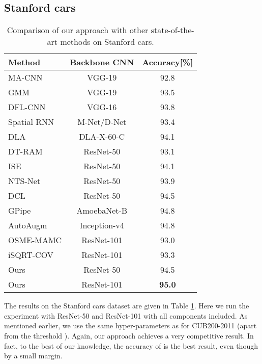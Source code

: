 \documentclass[10pt,twocolumn,letterpaper]{article}
\begin{document}
\subsection{Stanford cars}
\label{section:cars}
\begin{table}[h]
  \begin{center}
  \begin{tabular} {|l|c|c|}
    \hline
    Method & Backbone CNN &  Accuracy[\%] \\
    \hline
    \hline
    MA-CNN \cite{zheng2017learning} & VGG-19 &  92.8 \\
    GMM \cite{liang2018gmm} & VGG-19 &  93.5 \\
    DFL-CNN \cite{wang2018learning} & VGG-16  & 93.8 \\
    Spatial RNN \cite{wu2018deep} & M-Net/D-Net & 93.4\\
    DLA \cite{yu2018deep} & DLA-X-60-C  & 94.1 \\
    DT-RAM \cite{li2017dynamic} & ResNet-50 & 93.1 \\
    ISE \cite{simonelli2018increasingly} & ResNet-50 &  94.1 \\
    NTS-Net \cite{yang2018learning} & ResNet-50 & 93.9 \\
    DCL \cite{Chen_2019_CVPR} & ResNet-50 & 94.5 \\
    GPipe \cite{huang2018gpipe} & AmoebaNet-B &  94.8 \\
    AutoAugm \cite{cubuk2018autoaugment} & Inception-v4 &  94.8 \\
    OSME-MAMC \cite{sun2018multi} & ResNet-101 & 93.0 \\
    iSQRT-COV \cite{li2018towards} & ResNet-101 & 93.3 \\
    \hline
    Ours   & ResNet-50  & 94.5 \\
    Ours   & ResNet-101 &  \bf{95.0} \\
    \hline
  \end{tabular}
  \end{center}
  \caption{Comparison of our approach with other state-of-the-art methods on Stanford cars.}
  \label{table:cars}
\end{table}

The results on the Stanford cars dataset are given in Table \ref{table:cars}. Here we run the experiment with ResNet-50 and ResNet-101 with all components included. As mentioned earlier, we use the same hyper-parameters as for CUB200-2011 (apart from the threshold ). Again, our approach achieves a very competitive result. In fact, to the best of our knowledge, the accuracy of  is the best result, even though by a small margin. 
\end{document}
